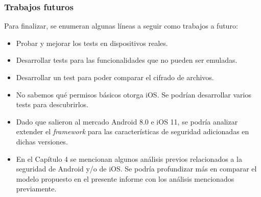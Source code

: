 \begin{frame}
 \frametitle{Trabajos futuros}
Para finalizar, se enumeran algunas líneas a seguir como trabajos a futuro:\pause
 \begin{small}
 \begin{itemize}[<+->]
    \item Probar y mejorar los tests en dispositivos reales.
    \item Desarrollar tests para las funcionalidades que no pueden ser emuladas.
    \item Desarrollar un test para poder comparar el cifrado de archivos.
    \item No sabemos qué permisos básicos otorga iOS. Se podrían desarrollar varios tests para descubrirlos.
    \item Dado que salieron al mercado Android 8.0 e iOS 11, se podría analizar extender el \emph{framework} para las características de seguridad adicionadas en dichas versiones.
    \item En el Capítulo 4 se mencionan algunos análisis previos relacionados a la seguridad de Android y/o de iOS. Se podría profundizar más en comparar el modelo propuesto en el presente informe con los análisis mencionados previamente.
 \end{itemize}
 \end{small}
\end{frame}

